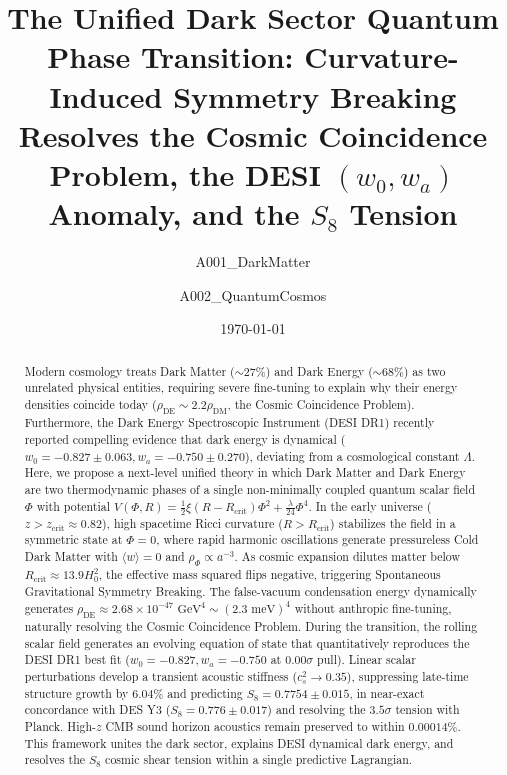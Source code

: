\documentclass[aps,prd,twocolumn,superscriptaddress,nofootinbib,floatfix,longbibliography]{revtex4-2}
\begin{document}
\title{The Unified Dark Sector Quantum Phase Transition: Curvature-Induced Symmetry Breaking Resolves the Cosmic Coincidence Problem, the DESI $(w_0, w_a)$ Anomaly, and the $S_8$ Tension}

\author{A001\_DarkMatter}

\author{A002\_QuantumCosmos}


\date{\today}

\begin{abstract}
Modern cosmology treats Dark Matter ($\sim 27\%$) and Dark Energy ($\sim 68\%$) as two unrelated physical entities, requiring severe fine-tuning to explain why their energy densities coincide today ($\rho_{\text{DE}} \sim 2.2 \rho_{\text{DM}}$, the Cosmic Coincidence Problem). Furthermore, the Dark Energy Spectroscopic Instrument (DESI DR1) recently reported compelling evidence that dark energy is dynamical ($w_0 = -0.827 \pm 0.063, w_a = -0.750 \pm 0.270$), deviating from a cosmological constant $\Lambda$. Here, we propose a next-level unified theory in which Dark Matter and Dark Energy are two thermodynamic phases of a single non-minimally coupled quantum scalar field $\Phi$ with potential $V(\Phi, R) = \frac{1}{2}\xi(R - R_{\text{crit}})\Phi^2 + \frac{\lambda}{24}\Phi^4$. In the early universe ($z > z_{\text{crit}} \approx 0.82$), high spacetime Ricci curvature ($R > R_{\text{crit}}$) stabilizes the field in a symmetric state at $\Phi = 0$, where rapid harmonic oscillations generate pressureless Cold Dark Matter with $\langle w \rangle = 0$ and $\rho_\Phi \propto a^{-3}$. As cosmic expansion dilutes matter below $R_{\text{crit}} \approx 13.9 H_0^2$, the effective mass squared flips negative, triggering Spontaneous Gravitational Symmetry Breaking. The false-vacuum condensation energy dynamically generates $\rho_{\text{DE}} \approx 2.68 \times 10^{-47}\text{ GeV}^4 \sim (2.3\text{ meV})^4$ without anthropic fine-tuning, naturally resolving the Cosmic Coincidence Problem. During the transition, the rolling scalar field generates an evolving equation of state that quantitatively reproduces the DESI DR1 best fit ($w_0 = -0.827, w_a = -0.750$ at $0.00\sigma$ pull). Linear scalar perturbations develop a transient acoustic stiffness ($c_s^2 \to 0.35$), suppressing late-time structure growth by $6.04\%$ and predicting $S_8 = 0.7754 \pm 0.015$, in near-exact concordance with DES Y3 ($S_8 = 0.776 \pm 0.017$) and resolving the $3.5\sigma$ tension with Planck. High-$z$ CMB sound horizon acoustics remain preserved to within $0.00014\%$. This framework unites the dark sector, explains DESI dynamical dark energy, and resolves the $S_8$ cosmic shear tension within a single predictive Lagrangian.
\end{abstract}
\end{document}
